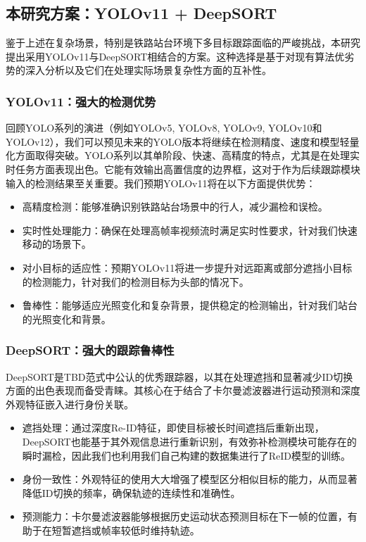 \subsection{本研究方案：YOLOv11 + DeepSORT}

鉴于上述在复杂场景，特别是铁路站台环境下多目标跟踪面临的严峻挑战，本研究提出采用YOLOv11与DeepSORT相结合的方案。这种选择是基于对现有算法优劣势的深入分析以及它们在处理实际场景复杂性方面的互补性。

\subsubsection{YOLOv11：强大的检测优势}

回顾YOLO系列的演进（例如YOLOv5, YOLOv8, YOLOv9, YOLOv10和YOLOv12），我们可以预见未来的YOLO版本将继续在检测精度、速度和模型轻量化方面取得突破。YOLO系列以其单阶段、快速、高精度的特点，尤其是在处理实时任务方面表现出色。它能有效输出高置信度的边界框，这对于作为后续跟踪模块输入的检测结果至关重要。我们预期YOLOv11将在以下方面提供优势：
\begin{itemize}
    \item 高精度检测：能够准确识别铁路站台场景中的行人，减少漏检和误检。
    \item 实时性处理能力：确保在处理高帧率视频流时满足实时性要求，针对我们快速移动的场景下。
    \item 对小目标的适应性：预期YOLOv11将进一步提升对远距离或部分遮挡小目标的检测能力，针对我们的检测目标为头部的情况下。
    \item 鲁棒性：能够适应光照变化和复杂背景，提供稳定的检测输出，针对我们站台的光照变化和背景。
\end{itemize}

\subsubsection{DeepSORT：强大的跟踪鲁棒性}
DeepSORT是TBD范式中公认的优秀跟踪器，以其在处理遮挡和显著减少ID切换方面的出色表现而备受青睐。其核心在于结合了卡尔曼滤波器进行运动预测和深度外观特征嵌入进行身份关联\cite{174}。
\begin{itemize}
    \item 遮挡处理：通过深度Re-ID特征，即使目标被长时间遮挡后重新出现，DeepSORT也能基于其外观信息进行重新识别，有效弥补检测模块可能存在的瞬时漏检，因此我们也利用我们自己构建的数据集进行了ReID模型的训练。
    \item 身份一致性：外观特征的使用大大增强了模型区分相似目标的能力，从而显著降低ID切换的频率，确保轨迹的连续性和准确性。
    \item 预测能力：卡尔曼滤波器能够根据历史运动状态预测目标在下一帧的位置，有助于在短暂遮挡或帧率较低时维持轨迹。
\end{itemize}

